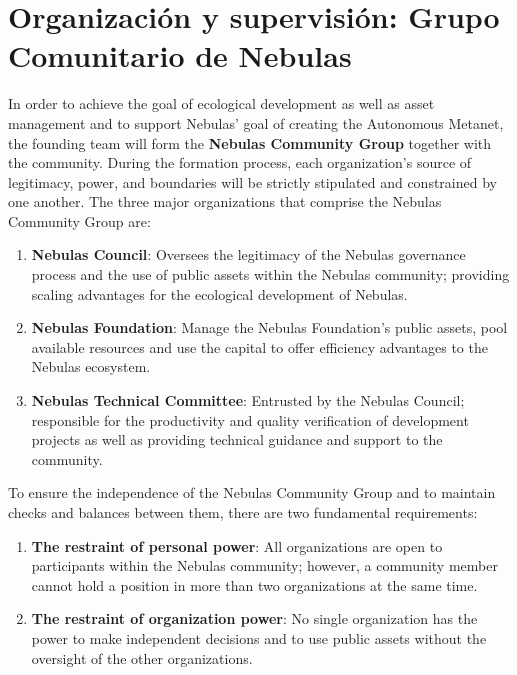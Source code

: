 \section{Organización y supervisión: Grupo Comunitario de Nebulas}

In order to achieve the goal of ecological development as well as asset management and to support Nebulas' goal of creating the Autonomous Metanet, the founding team will form the \textbf{Nebulas Community Group} together with the community. During the formation process, each organization's source of legitimacy, power, and boundaries will be strictly stipulated and constrained by one another. The three major organizations that comprise the Nebulas Community Group are:

\begin{enumerate}
	\item \textbf{Nebulas Council}: Oversees the legitimacy of the Nebulas governance process and the use of public assets within the Nebulas community; providing scaling advantages for the ecological development of Nebulas.
	\item \textbf{Nebulas Foundation}: Manage the Nebulas Foundation's public assets, pool available resources and use the capital to offer efficiency advantages to the Nebulas ecosystem.
	\item \textbf{Nebulas Technical Committee}: Entrusted by the Nebulas Council; responsible for the productivity and quality verification of development projects as well as providing technical guidance and support to the community.
\end{enumerate}

\vspace{2em}

To ensure the independence of the Nebulas Community Group and to maintain checks and balances between them, there are two fundamental requirements:

\begin{enumerate}
	\item \textbf{The restraint of personal power}: All organizations are open to participants within the Nebulas community; however, a community member cannot hold a position in more than two organizations at the same time.
	\item \textbf{The restraint of organization power}: No single organization has the power to make independent decisions and to use public assets without the oversight of the other organizations.
\end{enumerate}

